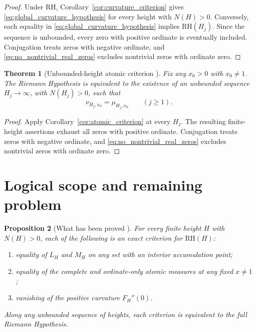 \documentclass[11pt]{amsart}
\numberwithin{equation}{section}
\theoremstyle{plain}
\newtheorem{theorem}{Theorem}[section]
\newtheorem{proposition}[theorem]{Proposition}
\theoremstyle{definition}
\theoremstyle{remark}
\newcommand{\RH}{\mathrm{RH}}
\begin{document}
\begin{proof}
Under $\RH$, Corollary~\ref{cor:curvature_criterion} gives \eqref{eq:global_curvature_hypothesis} for every height with $N(H)>0$.  Conversely, each equality in \eqref{eq:global_curvature_hypothesis} implies $\RH(H_j)$.  Since the sequence is unbounded, every zero with positive ordinate is eventually included.  Conjugation treats zeros with negative ordinate, and \eqref{eq:no_nontrivial_real_zeros} excludes nontrivial zeros with ordinate zero.
\end{proof}

\begin{theorem}[Unbounded-height atomic criterion {}]
\label{thm:global_atomic_criterion}
Fix any $x_0>0$ with $x_0\neq1$.  The Riemann Hypothesis is equivalent to the existence of an unbounded sequence $H_j\to\infty$, with $N(H_j)>0$, such that
\begin{equation}
\nu_{H_j,x_0}=\mu_{H_j,x_0}
\qquad(j\geq1).
\label{eq:global_atomic_hypothesis}
\end{equation}
\end{theorem}

\begin{proof}
Apply Corollary~\ref{cor:atomic_criterion} at every $H_j$.  The resulting finite-height assertions exhaust all zeros with positive ordinate.  Conjugation treats zeros with negative ordinate, and \eqref{eq:no_nontrivial_real_zeros} excludes nontrivial zeros with ordinate zero.
\end{proof}

\section{Logical scope and remaining problem}
\label{sec:scope}

\begin{proposition}[What has been proved {\normalfont[Unconditional]}]
\label{prop:scope_proved}
For every finite height $H$ with $N(H)>0$, each of the following is an exact criterion for $\RH(H)$:
\begin{enumerate}[label=\textup{(\alph*)}]
\item equality of $L_H$ and $M_H$ on any set with an interior accumulation point;
\item equality of the complete and ordinate-only atomic measures at any fixed $x\neq1$;
\item vanishing of the positive curvature $F_H''(0)$.
\end{enumerate}
Along any unbounded sequence of heights, each criterion is equivalent to the full Riemann Hypothesis.
\end{proposition}
\end{document}
